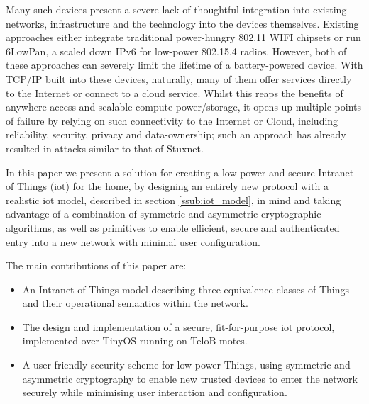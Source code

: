 \documentclass[conference]{./sty/IEEEtran}
\begin{document}
Many such devices present a severe lack of thoughtful integration into existing networks, infrastructure and the technology into the devices themselves. Existing approaches either integrate traditional power-hungry 802.11 WIFI chipsets or run 6LowPan, a scaled down IPv6 for low-power 802.15.4 radios. However, both of these approaches can severely limit the lifetime of a battery-powered device. With TCP/IP built into these devices, naturally, many of them offer services directly to the Internet\cite{MQTT,IETF_CORE,Xively} or connect to a cloud service\cite{SmartThings,Twine}. Whilst this reaps the benefits of anywhere access and scalable compute power/storage, it opens up multiple points of failure by relying on such connectivity to the Internet or Cloud, including reliability, security, privacy and data-ownership; such an approach has already resulted in attacks similar to that of Stuxnet\cite{IoTWorm}.

In this paper we present a solution for creating a low-power and secure Intranet of Things (iot) for the home, by designing an entirely new protocol with a realistic iot model, described in section \ref{ssub:iot_model}, in mind and taking advantage of a combination of symmetric and asymmetric cryptographic algorithms, as well as primitives to enable efficient, secure and authenticated entry into a new network with minimal user configuration.


The main contributions of this paper are:
\begin{itemize}
  \item An Intranet of Things model describing three equivalence classes of Things and their operational semantics within the network.
  \item The design and implementation of a secure, fit-for-purpose iot protocol, implemented over TinyOS running on TeloB motes.
  \item A user-friendly security scheme for low-power Things, using symmetric and asymmetric cryptography to enable new trusted devices to enter the network securely while minimising user interaction and configuration.  
\end{itemize}
\end{document}

